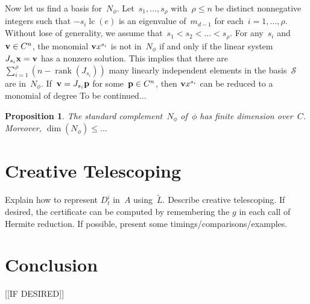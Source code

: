 \documentclass{sig-alternate}
\newtheorem{prop}[theorem]{Proposition}
\newcommand{\red}{\color{red}}
\newcommand{\cS}{ {\mathcal S}}
\newcommand{\vp} {{\bf p}}
\newcommand{\vv} {{\bf v}}
\newcommand{\vx} {{\bf x}}
\def\lc{\operatorname{lc}}
\def\rank{\operatorname{rank}}
\begin{document}
Now let us find a basis for~$N_\phi$. Let~$s_1, \ldots, s_\rho$ with~$\rho\leq n$ be distinct nonnegative integers such that
$-s_i\lc(e)$ is an eigenvalue of~$m_{d-1}$ for each~$i=1, \ldots, \rho$.
Without lose of generality,
we assume that~$s_1 <s_2<\ldots<s_\rho$. For any~$s_i$ and~$\vv\in C^n$, the monomial $\vv x^{s_i}$ is not in~$N_\phi$
if and only if the linear system~$J_{s_i}\vx = \vv$
has a nonzero solution. This implies that there are $\sum_{i=1}^\rho (n-\rank(J_{s_i}))$ many linearly
independent elements in the basis~$\cS$ are in~$N_\phi$. If~$\vv = J_{s_i} \vp$ for some~$\vp\in C^n$, then
$\vv x^{s_i}$ can be reduced to a monomial of degree {\red To be continued...}

\begin{prop}\label{prop:Nphi}
The standard complement~$N_\phi$ of~$\phi$ has finite dimension over~$C$. Moreover,
$\dim(N_\phi) \leq ...$
\end{prop}


\section{Creative Telescoping}

Explain how to represent $D_t^i$ in~$A$ using~$\tilde{L}$.
Describe creative telescoping.
If desired, the certificate can be computed by remembering the $g$ in each call of Hermite reduction.
If possible, present some timings/comparisons/examples.


\section{Conclusion}

[[IF DESIRED]]



\end{document}
